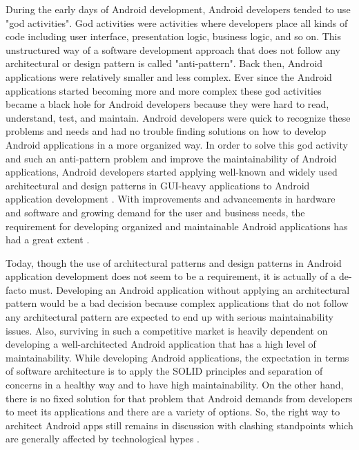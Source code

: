 During the early days of Android development, Android developers tended to use "god activities". God activities were activities where developers place all kinds of code including user interface, presentation logic, business logic, and so on. This unstructured way of a software development approach that does not follow any architectural or design pattern is called "anti-pattern". Back then, Android applications were relatively smaller and less complex. Ever since the Android applications started becoming more and more complex these god activities became a black hole for Android developers because they were hard to read, understand, test, and maintain. Android developers were quick to recognize these problems and needs and had no trouble finding solutions on how to develop Android applications in a more organized way. In order to solve this god activity and such an anti-pattern problem and improve the maintainability of Android applications, Android developers started applying well-known and widely used architectural and design patterns in GUI-heavy applications to Android application development \cite{19}. With improvements and advancements in hardware and software and growing demand for the user and business needs, the requirement for developing organized and maintainable Android applications has had a great extent \cite{18}.

Today, though the use of architectural patterns and design patterns in Android application development does not seem to be a requirement, it is actually of a de-facto must. Developing an Android application without applying an architectural pattern would be a bad decision because complex applications that do not follow any architectural pattern are expected to end up with serious maintainability issues. Also, surviving in such a competitive market is heavily dependent on developing a well-architected Android application that has a high level of maintainability. While developing Android applications, the expectation in terms of software architecture is to apply the SOLID principles and separation of concerns in a healthy way and to have high maintainability. On the other hand, there is no fixed solution for that problem that Android demands from developers to meet its applications and there are a variety of options. So, the right way to architect Android apps still remains in discussion with clashing standpoints which are generally affected by technological hypes \cite{14}.

